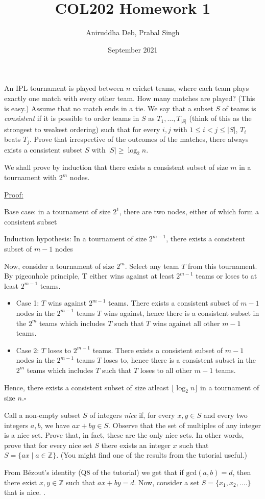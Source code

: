 \documentclass[12pt,answers]{exam}
\title{\vspace{-2em}COL202 Homework 1\vspace{-0.3em}}
\author{Aniruddha Deb, Prabal Singh\vspace{-1em}}
\date{September 2021}
\begin{document}
\maketitle
\pagestyle{empty}
\begin{questions}

\question An IPL tournament is played between $n$ cricket teams, where each team plays exactly one match with every other team. How many matches are played? (This is easy.) Assume that no match ends in a tie. We say that a subset $S$ of teams is \textit{consistent} if it is possible to order teams in $S$ as $T_1,\ldots,T_{|S|}$ (think of this as the strongest to weakest ordering) such that for every $i,j$ with $1\leq i<j\leq|S|$, $T_i$ beats $T_j$. Prove that irrespective of the outcomes of the matches, there always exists a consistent subset $S$ with $|S|\geq\log_2 n$.
\begin{solution}
We shall prove by induction that there exists a consistent subset of size $m$ in a tournament with $2^m$ nodes.

\underline{Proof:} 

Base case: in a tournament of size $2^1$, there are two nodes, either of which form a consistent subset

Induction hypothesis: In a tournament of size $2^{m-1}$, there exists a consistent subset of $m-1$ nodes

Now, consider a tournament of size $2^{m}$. Select any team $T$ from this tournament. By pigeonhole principle, T either wins against at least $2^{m-1}$ teams or loses to at least $2^{m-1}$ teams. 
\begin{itemize}
    \item Case 1: $T$ wins against $2^{m-1}$ teams. There exists a consistent subset of $m-1$ nodes in the $2^{m-1}$ teams $T$ wins against, hence there is a consistent subset in the $2^m$ teams which includes $T$ such that $T$ wins against all other $m-1$ teams.
    \item Case 2: $T$ loses to $2^{m-1}$ teams. There exists a consistent subset of $m-1$ nodes in the $2^{m-1}$ teams $T$ loses to, hence there is a consistent subset in the $2^m$ teams which includes $T$ such that $T$ loses to all other $m-1$ teams.
\end{itemize}

Hence, there exists a consistent subset of size atleast $\lfloor \log_2 n\rfloor$ in a tournament of size $n$.\hfill $\square$
\end{solution}

\question Call a non-empty subset $S$ of integers \textit{nice} if, for every $x,y\in S$ and every two integers $a,b$, we have $ax+by\in S$. Observe that the set of multiples of any integer is a nice set. Prove that, in fact, these are the only nice sets. In other words, prove that for every nice set $S$ there exists an integer $x$ such that $S=\{ax\mid a\in\mathbb{Z}\}$. (You might find one of the results from the tutorial useful.)
\begin{solution}
From Bézout's identity (Q8 of the tutorial) we get that if $\text{gcd}(a,b) = d$, then there exist $x,y \in \mathbb{Z}$ such that $ax + by = d$. Now, consider a set $S = \{x_1, x_2, ....\}$ that is nice. . 


\end{solution}
\end{questions}
\end{document}
